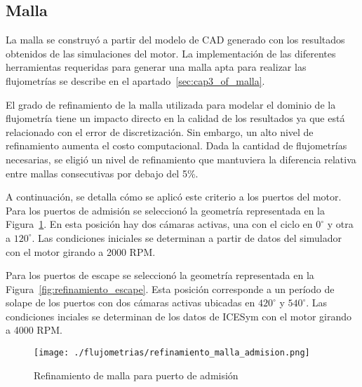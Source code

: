 

\subsection{Malla}

La malla se construyó a partir del modelo de CAD generado con los resultados
obtenidos de las simulaciones del motor.
%
La implementación de las diferentes herramientas requeridas para generar una
malla apta para realizar las flujometrías se describe en el
apartado~\ref{sec:cap3_of_malla}.

El grado de refinamiento de la malla utilizada para modelar el dominio de la
flujometría tiene un impacto directo en la calidad de los resultados ya que está
relacionado con el error de discretización.
%
Sin embargo, un alto nivel de refinamiento aumenta el costo computacional.
%
Dada la cantidad de flujometrías necesarias, se eligió un nivel de refinamiento
que mantuviera la diferencia relativa entre mallas consecutivas por debajo del
5\%.

A continuación, se detalla cómo se aplicó este criterio a los puertos del motor.
%
Para los puertos de admisión se seleccionó la geometría representada en la
Figura~\ref{fig:refinamiento_admision}.
%
En esta posición hay dos cámaras activas, una con el ciclo en $0^{\circ}$ y otra
a $120^{\circ}$.
%
Las condiciones iniciales se determinan a partir de datos del simulador con el
motor girando a 2000 RPM.%


Para los puertos de escape se seleccionó la geometría representada en la
Figura~\ref{fig:refinamiento_escape}.
%
Esta posición corresponde a un período de solape de los puertos con dos cámaras
activas ubicadas en $420^{\circ}$ y $540^{\circ}$.
%
Las condiciones inciales se determinan de los datos de ICESym con el motor
girando a 4000 RPM.

\begin{figure}[h!]  \centering
\texttt{[image: ./flujometrias/refinamiento\_malla\_admision.png]}
  \caption{Refinamiento de malla para puerto de
admisión}\label{fig:refinamiento_admision}
\end{figure}

